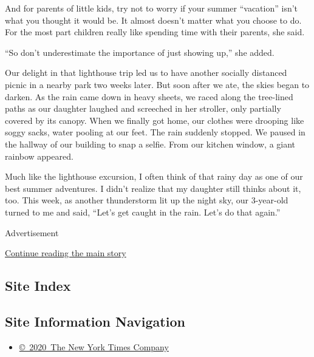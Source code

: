 And for parents of little kids, try not to worry if your summer
``vacation'' isn't what you thought it would be. It almost doesn't
matter what you choose to do. For the most part children really like
spending time with their parents, she said.

``So don't underestimate the importance of just showing up,'' she added.

Our delight in that lighthouse trip led us to have another socially
distanced picnic in a nearby park two weeks later. But soon after we
ate, the skies began to darken. As the rain came down in heavy sheets,
we raced along the tree-lined paths as our daughter laughed and
screeched in her stroller, only partially covered by its canopy. When we
finally got home, our clothes were drooping like soggy sacks, water
pooling at our feet. The rain suddenly stopped. We paused in the hallway
of our building to snap a selfie. From our kitchen window, a giant
rainbow appeared.

Much like the lighthouse excursion, I often think of that rainy day as
one of our best summer adventures. I didn't realize that my daughter
still thinks about it, too. This week, as another thunderstorm lit up
the night sky, our 3-year-old turned to me and said, ``Let's get caught
in the rain. Let's do that again.''

Advertisement

\protect\hyperlink{after-bottom}{Continue reading the main story}

\hypertarget{site-index}{%
\subsection{Site Index}\label{site-index}}

\hypertarget{site-information-navigation}{%
\subsection{Site Information
Navigation}\label{site-information-navigation}}

\begin{itemize}
\tightlist
\item
  \href{https://help.nytimes3xbfgragh.onion/hc/en-us/articles/115014792127-Copyright-notice}{©~2020~The
  New York Times Company}
\end{itemize}

